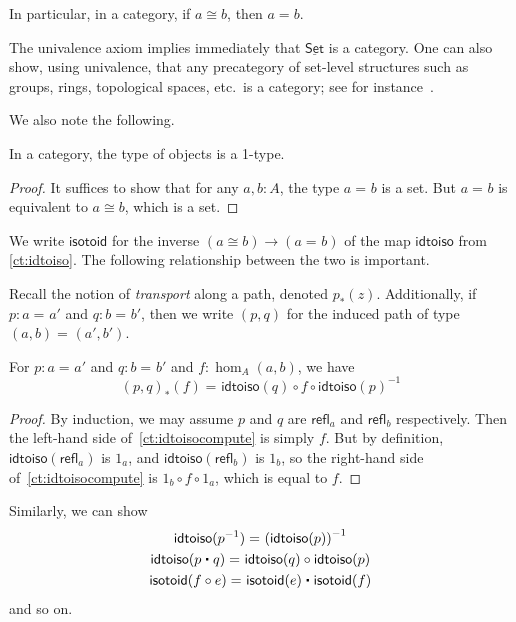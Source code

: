 \documentclass{mscs}
\newcommand{\id}[3][]{\ensuremath{#2 =_{#1} #3}\xspace}
\newcommand{\refl}[1]{\ensuremath{\mathsf{refl}_{#1}}\xspace}
\newcommand{\ct}{\mathrel{\raisebox{.5ex}{$\centerdot$}}}
\newcommand{\opp}[1]{\mathord{{#1}^{-1}}}
\let\rev\opp
\newcommand{\trans}[2]{\ensuremath{{#1}_{*}\!\left({#2}\right)}\xspace}
\renewcommand{\set}{\ensuremath{\mathsf{Set}}\xspace}
\newcommand{\uset}{\ensuremath{\underline{\set}}\xspace}
\numberwithin{equation}{section}
\newcommand{\inv}[1]{{#1}^{-1}}
\newcommand{\idtoiso}{\ensuremath{\mathsf{idtoiso}}\xspace}
\newcommand{\isotoid}{\ensuremath{\mathsf{isotoid}}\xspace}
\begin{document}
In particular, in a category, if $a\cong b$, then $a=b$.

\begin{eg}\label{ct:eg:set}
  The univalence axiom implies immediately that \uset is a category.
  One can also show, using univalence, that any precategory of set-level structures such as groups, rings, topological spaces, etc.\ is a category; see for instance~\parencite{dc:isoeq}.
\end{eg}

We also note the following.

\begin{lem}\label{ct:obj-1type}
  In a category, the type of objects is a 1-type.
\end{lem}
\begin{proof}
  It suffices to show that for any $a,b:A$, the type $\id a b$ is a set.
  But $\id a b$ is equivalent to $a \cong b$, which is a set.
\end{proof}

We write $\isotoid$ for the inverse $(a\cong b) \to (\id a b)$ of the map $\idtoiso$ from \autoref{ct:idtoiso}.
The following relationship between the two is important.

Recall the notion of \emph{transport} along a path, denoted $\trans p z$.
Additionally, if $p:\id a a'$ and $q:\id b b'$, then we write $(p,q)$ for the induced path of type $\id{(a,b)}{(a',b')}$.

\begin{lem}\label{ct:idtoiso-trans}
  For $p:\id a a'$ and $q:\id b b'$ and $f:\hom_A(a,b)$, we have
  \begin{equation}\label{ct:idtoisocompute}
    \id{\trans{(p,q)}{f}}
    {\idtoiso(q)\circ f \circ \inv{\idtoiso(p)}}
  \end{equation}
\end{lem}
\begin{proof}
  By induction, we may assume $p$ and $q$ are $\refl a$ and $\refl b$ respectively.
Then the left-hand side of~\eqref{ct:idtoisocompute} is simply $f$.
  But by definition, $\idtoiso(\refl a)$ is $1_a$, and $\idtoiso(\refl b)$ is $1_b$, so the right-hand side of~\eqref{ct:idtoisocompute} is $1_b\circ f\circ 1_a$, which is equal to $f$.
\end{proof}

Similarly, we can show
\begin{gather}
  \id{\idtoiso(\rev p)}{\inv {(\idtoiso(p))}}\\
  \id{\idtoiso(p\ct q)}{\idtoiso(q)\circ \idtoiso(p)}\\
  \id{\isotoid(f\circ e)}{\isotoid(e)\ct \isotoid(f)}
\end{gather}
and so on.
\end{document}
